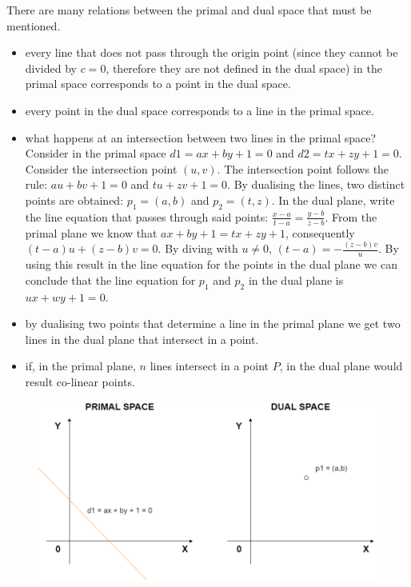 \documentclass[letterpaper]{article}
\begin{document}
There are many relations between the primal and dual space that must be mentioned.

\begin{itemize}
    \item every line that does not pass through the origin point (since they cannot be divided by $c = 0$, therefore they are not defined in the dual space) in the primal space corresponds to a point in the dual space.
    
    \item every point in the dual space corresponds to a line in the primal space.

    \item what happens at an intersection between two lines in the primal space? Consider in the primal space $d1 = ax + by + 1 = 0$ and $d2 = tx + zy + 1 = 0$. Consider the intersection point $(u,v)$. The intersection point follows the rule: $au + bv + 1 = 0$ and $tu + zv + 1 = 0$. By dualising the lines, two distinct points are obtained: $p_1 = (a,b)$ and $p_2 = (t,z)$. In the dual plane, write the line equation that passes through said points: $\frac{x - a}{t - a} = \frac{y - b}{z - b}$. From the primal plane we know that $ax + by + 1 = tx + zy + 1$, consequently $(t - a)u + (z - b)v =0 $. By diving with $u \neq 0$, $(t - a) = - \frac{(z-b)v}{u}$. By using this result in the line equation for the points in the dual plane we can conclude that the line equation for $p_1$ and $p_2$ in the dual plane is $ux + wy + 1 = 0$.

    \item by dualising two points that determine a line in the primal plane we get two lines in the dual plane that intersect in a point.

    \item if, in the primal plane, $n$ lines intersect in a point $P$, in the dual plane would result co-linear points. 

\end{itemize}

\begin{figure} [h!]
\centering
\includegraphics[width=1\textwidth]{pngOfDiagrams/dual3.png}
\end{figure}
\end{document}

